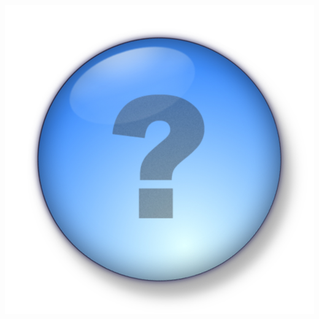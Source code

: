 \documentclass[colorlinks]{beamer}
\begin{document}



\begin{frame} 
  \begin{center}
    \centering \includegraphics[width=0.5\linewidth]{figs/question_mark}
  \end{center}
\end{frame}
\end{document}
